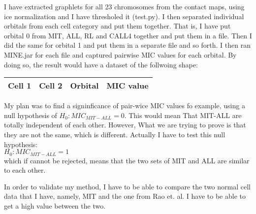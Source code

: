 \documentclass{article}
\begin{document}
\fontsize{13pt}{26pt}\selectfont

\setlength{\parindent}{0pt}
I have extracted graphlets for all 23 chromosomes from
the contact maps, using ice normalization and I
have thresholed it (test.py). I then separated individual
orbitals from each cell category and put them together.
That is, I have put orbital 0 from MIT, ALL, RL and CALL4
together and put them in a file. Then I did the same for orbital
1 and put them in a separate file and so forth. I then ran MINE.jar
for each file and captured pairwise MIC values for each orbital.
By doing so, the result would have a dataset of the follwoing shape:
\begin{table}[H]
    \centering
    \begin{tabular}{|c|c|c|c|}
        \hline
        Cell 1 & Cell 2 & Orbital & MIC value\\ \hline
    \end{tabular}
\end{table}
My plan was to find a signinficance of pair-wice MIC values 
fo example, using a
null hypothesis of $H_0: MIC_{MIT-ALL} = 0$. This would mean
That MIT-ALL are totally independent of each other. However,
What we are trying to prove is that they are not the same,
which is different. Actually I have to test this null hypothesis:\\
$H_0: MIC_{MIT-ALL} = 1$\\
which if cannot be rejected, means that the two sets of MIT and ALL
are similar to each other.

In order to validate my method, I have to be able to compare the two
normal cell data that I have, namely, MIT and the one from Rao et. al.
I have to be able to get a high value between the two.
\end{document}
